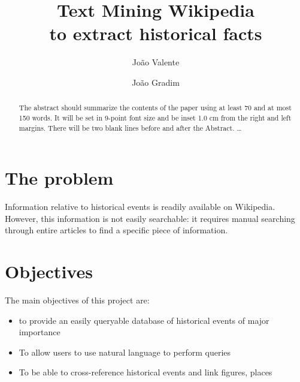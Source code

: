 \documentclass{llncs}
\begin{document}
\mainmatter              %
%
\title{Text Mining Wikipedia\\to extract historical facts}
%
%
\author{João Valente \and João Gradim}
%
%
%

\maketitle              %

\begin{abstract}
The abstract should summarize the contents of the paper
using at least 70 and at most 150 words. It will be set in 9-point
font size and be inset 1.0 cm from the right and left margins.
There will be two blank lines before and after the Abstract. \dots
\end{abstract}

%
\section{The problem}

Information relative to historical events is readily available on Wikipedia. However, this information is not easily searchable: it requires manual searching through entire articles to find a specific piece of information.

%
\section{Objectives}

The main objectives of this project are:

\begin{itemize}
	\item to provide an easily queryable database of historical events of major importance
	\item To allow users to use natural language to perform queries
	\item To be able to cross-reference historical events and link figures, places
\end{itemize}
\end{document}
